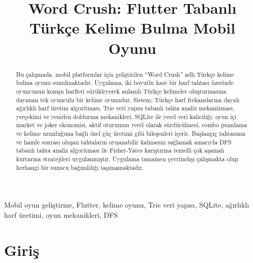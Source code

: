 \documentclass[conference]{IEEEtran}
\begin{document}
\shorthandoff{=}

\title{Word Crush: Flutter Tabanlı Türkçe Kelime Bulma Mobil Oyunu}

\author{
\and
{}
}

\maketitle

\begin{abstract}
Bu çalışmada, mobil platformlar için geliştirilen ``Word Crush'' adlı Türkçe kelime bulma oyunu sunulmaktadır. Uygulama, iki boyutlu kare bir harf tahtası üzerinde oyuncunun komşu harfleri sürükleyerek anlamlı Türkçe kelimeler oluşturmasına dayanan tek oyunculu bir kelime oyunudur. Sistem; Türkçe harf frekanslarına dayalı ağırlıklı harf üretim algoritması, Trie veri yapısı tabanlı tahta analiz mekanizması, yerçekimi ve yeniden doldurma mekanikleri, SQLite ile yerel veri kalıcılığı, oyun içi market ve joker ekonomisi, aktif oturumun yerel olarak sürdürülmesi, combo puanlama ve kelime uzunluğuna bağlı özel güç üretimi gibi bileşenleri içerir. Başlangıç tahtasının ve hamle sonrası oluşan tahtaların oynanabilir kalmasını sağlamak amacıyla DFS tabanlı tahta analiz algoritması ile Fisher-Yates karıştırma temelli çok aşamalı kurtarma stratejileri uygulanmıştır. Uygulama tamamen çevrimdışı çalışmakta olup herhangi bir sunucu bağımlılığı taşımamaktadır.
\end{abstract}

\begin{IEEEkeywords}
Mobil oyun geliştirme, Flutter, kelime oyunu, Trie veri yapısı, SQLite, ağırlıklı harf üretimi, oyun mekanikleri, DFS
\end{IEEEkeywords}

\section{Giriş}
\end{document}
